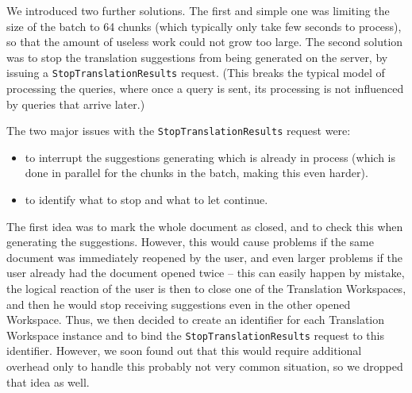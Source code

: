 {We introduced two further solutions. The first and simple one was limiting the size of the batch to 64 chunks (which typically only take few seconds to process), so that the amount of useless work could not grow too large. The second solution was to stop the translation suggestions from being generated on the server, by issuing a {\tt StopTranslationResults} request. (This breaks the typical model of processing the queries, where once a query is sent, its processing is not influenced by queries that arrive later.)

The two major issues with the {\tt StopTranslationResults} request were:

\begin{itemize}
	\item to interrupt the suggestions generating which is already in process (which is done in parallel for the chunks in the batch, making this even harder).
	\item to identify what to stop and what to let continue.
\end{itemize}

The first idea was to mark the whole document as closed, and to check this when generating the suggestions. However, this would cause problems if the same document was immediately reopened by the user, and even larger problems if the user already had the document opened twice -- this can easily happen by mistake, the logical reaction of the user is then to close one of the Translation Workspaces, and then he would stop receiving suggestions even in the other opened Workspace. Thus, we then decided to create an identifier for each Translation Workspace instance and to bind the {\tt StopTranslationResults} request to this identifier. However, we soon found out that this would require additional overhead only to handle this probably not very common situation, so we dropped that idea as well.

}
